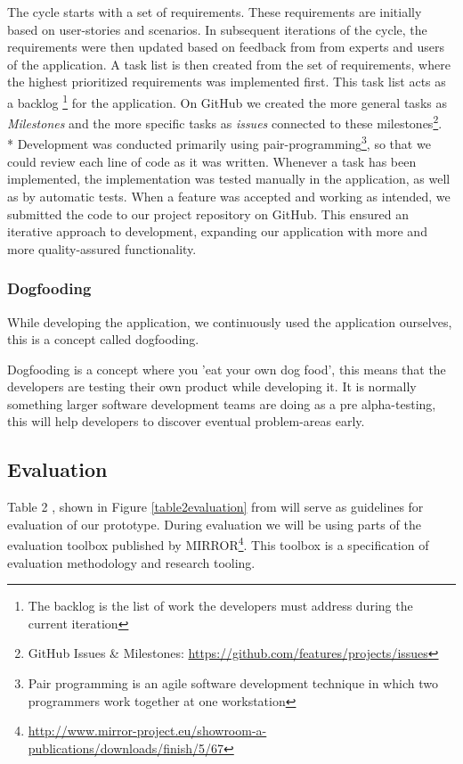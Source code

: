 The cycle starts with a set of requirements. These requirements are initially based on user-stories and scenarios. In subsequent iterations of the cycle, the requirements were then updated based on feedback from from experts and users of the application. A task list is then created from the set of requirements, where the highest prioritized requirements was implemented first. This task list acts as a backlog 
\footnote{The backlog is the list of work the developers must address during the current iteration} for the application. On GitHub we created the more general tasks as \emph{Milestones} and the more specific tasks as \emph{issues} connected to these milestones\footnote{GitHub Issues \& Milestones: \url{https://github.com/features/projects/issues}}.\\* Development was conducted primarily using pair-programming\footnote{Pair programming is an agile software development technique in which two programmers work together at one workstation}, so that we could review each line of code as it was written. Whenever a task has been implemented, the implementation was tested manually in the application, as well as by automatic tests. When a feature was accepted and working as intended, we submitted the code to our project repository on GitHub.
This ensured an iterative approach to development, expanding our application with more and more quality-assured functionality. 

\subsubsection*{Dogfooding}
While developing the application, we continuously used the application ourselves, this is a concept called dogfooding.

Dogfooding is a concept where you 'eat your own dog food', this means that the developers are testing their own product while developing it\citep{dogfooding}. It is normally something larger software development teams are doing as a pre alpha-testing, this will help developers to discover eventual problem-areas early.

\subsection{Evaluation} 
Table 2 , shown in Figure \ref{table2evaluation} from \citep{Esearch2004} will serve as guidelines for evaluation of our prototype.
During evaluation we will be using parts of the evaluation toolbox published by MIRROR\footnote{\url{http://www.mirror-project.eu/showroom-a-publications/downloads/finish/5/67}}. This toolbox is a specification of evaluation methodology and research tooling. 

